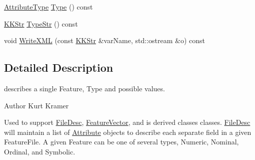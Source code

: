 \begin{DoxyCompactItemize}
\item 
\hyperlink{namespace_k_k_m_l_l_a99973706982b59debba670e2480555ab}{Attribute\+Type} \hyperlink{class_k_k_m_l_l_1_1_attribute_ae867c1b4e264fb7be26941730364116d}{Type} () const 
\item 
\hyperlink{class_k_k_b_1_1_k_k_str}{K\+K\+Str} \hyperlink{class_k_k_m_l_l_1_1_attribute_a37e2ba1b7741ce73ecdf3bda24be3e11}{Type\+Str} () const 
\item 
void \hyperlink{class_k_k_m_l_l_1_1_attribute_a1304910749f5392ac7beedb702b93799}{Write\+X\+ML} (const \hyperlink{class_k_k_b_1_1_k_k_str}{K\+K\+Str} \&var\+Name, std\+::ostream \&o) const 
\end{DoxyCompactItemize}


\subsection{Detailed Description}
describes a single Feature, Type and possible values. 

\begin{DoxyAuthor}{Author}
Kurt Kramer
\end{DoxyAuthor}
Used to support \textquotesingle{}\hyperlink{class_k_k_m_l_l_1_1_file_desc}{File\+Desc}\textquotesingle{}, \textquotesingle{}\hyperlink{class_k_k_m_l_l_1_1_feature_vector}{Feature\+Vector}\textquotesingle{}, and is derived classes classes. \hyperlink{class_k_k_m_l_l_1_1_file_desc}{File\+Desc} will maintain a list of \textquotesingle{}\hyperlink{class_k_k_m_l_l_1_1_attribute}{Attribute}\textquotesingle{} objects to describe each separate field in a given Feature\+File. A given Feature can be one of several types, Numeric, Nominal, Ordinal, and Symbolic.


